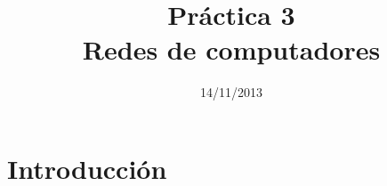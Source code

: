\documentclass[a4paper, 11pt]{article}	%
\title{Práctica 3\\Redes de computadores}						%
\author{\enriquename \and \guillermoname}						%
\date{14/11/2013}												%
\begin{document}
\maketitle			%
\newpage				%
\tableofcontents		%
\newpage				%

\section{Introducción}	%
\end{document}
